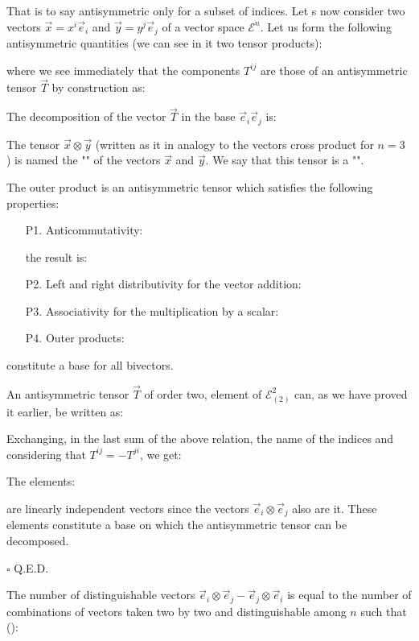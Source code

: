 	That is to say antisymmetric only for a subset of indices.
	Let s now consider two vectors $\vec{x}=x^i\vec{e}_i$ and $\vec{y}=y^j\vec{e}_j$ of a vector space $\mathcal{E}^n$. Let us form the following antisymmetric quantities (we can see in it two tensor products):
	
	where we see immediately that the components $T^{ij}$ are those of an antisymmetric tensor $\vec{T}$ by construction as:
	
	The decomposition of the vector $\vec{T}$ in the base $\vec{e}_i\vec{e}_j$ is:
	
	The tensor $\vec{x}\otimes\vec{y}$ (written as it in analogy to the vectors cross product for $n=3$ ) is named the "" of the vectors $\vec{x}$ and $\vec{y}$. We say that this tensor is a "".
	
	The outer product is an antisymmetric tensor which satisfies the following properties:
	\begin{enumerate}
		\item[P1.] Anticommutativity:
		
		the result is:
		

		\item[P2.] Left and right distributivity for the vector addition:
		

		\item[P3.] Associativity for the multiplication by a scalar:
		

		\item[P4.] Outer products:
		
	\end{enumerate}
	constitute a base for all bivectors.
	\begin{dem}
	An antisymmetric tensor $\vec{T}$ of order two, element of $\mathcal{E}_{(2)}^2$ can, as we have proved it earlier, be written as:
	
	Exchanging, in the last sum of the above relation, the name of the indices and considering that $T^{ij}=-T^{ji}$, we get:
	
	The elements:
	
	are linearly independent vectors since the vectors $\vec{e}_i\otimes\vec{e}_j$ also are it. These elements constitute a base on which the antisymmetric tensor can be decomposed.
	\begin{flushright}
		$\square$  Q.E.D.
	\end{flushright}
	\end{dem}
	The number of distinguishable vectors $\vec{e}_i\otimes\vec{e}_j-\vec{e}_j\otimes\vec{e}_i$ is equal to the number of combinations of vectors taken two by two and distinguishable among $n$ such that ():
	
